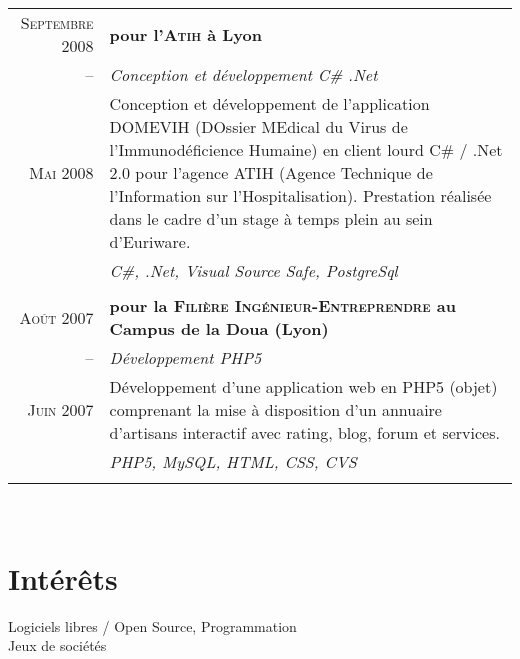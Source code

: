 \documentclass[a4paper,10pt]{article}
\begin{document}
\begin{supertabular}{r|p{11cm}}
  \textsc{Septembre 2008} & \textbf{pour l'\textsc{Atih} à Lyon}                                                         \\
  -- & \emph{Conception et développement C\# .Net}                                                                      \\
  \footnotesize{\textsc{Mai 2008}} & \footnotesize{Conception et développement de l’application DOMEVIH (DOssier MEdical du Virus de l’Immunodéficience Humaine) en client lourd C\# / .Net 2.0 pour l’agence ATIH (Agence Technique de l'Information sur l'Hospitalisation). Prestation réalisée dans le cadre d'un stage à temps plein au sein d'Euriware.} \\
  & \emph{C\#, .Net, Visual Source Safe, PostgreSql}                                                                     \\
                                                                                                     \\
  \textsc{Août 2007} & \textbf{pour la \textsc{Filière Ingénieur-Entreprendre} au Campus de la Doua (Lyon)}              \\
  -- & \emph{Développement PHP5}                                                                                        \\
  \footnotesize{\textsc{Juin 2007}} & \footnotesize{Développement d’une application web en PHP5 (objet) comprenant la mise à disposition d’un annuaire d’artisans interactif avec rating, blog, forum et services.} \\
  & \emph{PHP5, MySQL, HTML, CSS, CVS}                                                                                   \\
                                                                                                     \\
\end{supertabular}
\\
\section{Intérêts}
Logiciels libres / Open Source, Programmation \\
Jeux de sociétés
\end{document}
